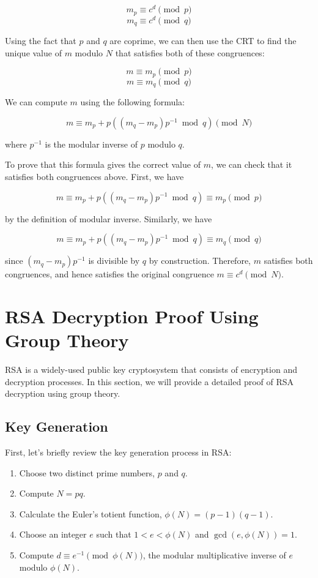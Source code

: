 \documentclass{article}
\theoremstyle{definition}
\begin{document}
$$ m_p \equiv c^d \pmod{p} $$
$$ m_q \equiv c^d \pmod{q} $$

Using the fact that $p$ and $q$ are coprime, we can then use the CRT to find the unique value of $m$ modulo $N$ that satisfies both of these congruences:

$$ m \equiv m_p \pmod{p} $$
$$ m \equiv m_q \pmod{q} $$

We can compute $m$ using the following formula:

$$ m \equiv m_p + p((m_q - m_p)p^{-1}\bmod{q}) \pmod{N} $$

where $p^{-1}$ is the modular inverse of $p$ modulo $q$.

To prove that this formula gives the correct value of $m$, we can check that it satisfies both congruences above. First, we have

$$ m \equiv m_p + p((m_q - m_p)p^{-1}\bmod{q}) \equiv m_p \pmod{p} $$

by the definition of modular inverse. Similarly, we have

$$ m \equiv m_p + p((m_q - m_p)p^{-1}\bmod{q}) \equiv m_q \pmod{q} $$

since $(m_q - m_p)p^{-1}$ is divisible by $q$ by construction. Therefore, $m$ satisfies both congruences, and hence satisfies the original congruence $m \equiv c^d \pmod{N}$.

\newpage

	\section*{RSA Decryption Proof Using Group Theory}
	
	RSA is a widely-used public key cryptosystem that consists of encryption and decryption processes. In this section, we will provide a detailed proof of RSA decryption using group theory.
	
	\subsection*{Key Generation}
	First, let's briefly review the key generation process in RSA:
	
	\begin{enumerate}
		\item Choose two distinct prime numbers, $p$ and $q$.
		\item Compute $N = pq$.
		\item Calculate the Euler's totient function, $\phi(N) = (p - 1)(q - 1)$.
		\item Choose an integer $e$ such that $1 < e < \phi(N)$ and $\gcd(e, \phi(N)) = 1$.
		\item Compute $d \equiv e^{-1} \pmod{\phi(N)}$, the modular multiplicative inverse of $e$ modulo $\phi(N)$.
	\end{enumerate}
	
\end{document}
